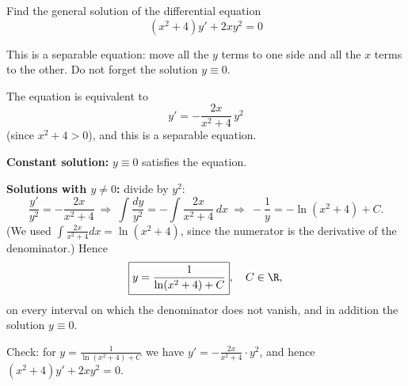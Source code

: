 
\begin{question}
Find the general solution of the differential equation
\[ (x^2+4)y'+2xy^2=0 \]
\end{question}

\begin{hint}
This is a separable equation: move all the $y$ terms to one side and all the $x$ terms to the other. Do not forget the solution $y\equiv0$.
\end{hint}

\begin{solution}
The equation is equivalent to
\[ y'=-\frac{2x}{x^2+4}\,y^2 \]
(since $x^2+4>0$), and this is a separable equation.

\textbf{Constant solution:} $y\equiv0$ satisfies the equation.

\textbf{Solutions with $y\neq0$:} divide by $y^2$:
\[ \frac{y'}{y^2}=-\frac{2x}{x^2+4}\ \Longrightarrow\ \int\frac{dy}{y^2}=-\int\frac{2x}{x^2+4}\,dx \ \Longrightarrow\ -\frac1y=-\ln(x^2+4)+C. \]
(We used $\int\frac{2x}{x^2+4}dx=\ln(x^2+4)$, since the numerator is the derivative of the denominator.) Hence
\[ \boxed{y=\frac{1}{\ln(x^2+4)+C}},\quad C\in\R, \]
on every interval on which the denominator does not vanish, and in addition the solution $\boxed{y\equiv0}$.

Check: for $y=\frac1{\ln(x^2+4)+C}$ we have $y'=-\frac{2x}{x^2+4}\cdot y^2$, and hence $(x^2+4)y'+2xy^2=0$.
\end{solution}
